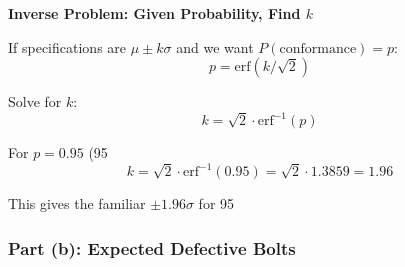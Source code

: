 \documentclass[12pt]{article}
\begin{document}
\begin{explanation}
\textbf{Inverse Problem: Given Probability, Find $k$}

If specifications are $\mu \pm k\sigma$ and we want $P(\text{conformance}) = p$:
\[
p = \text{erf}(k/\sqrt{2})
\]

Solve for $k$:
\[
k = \sqrt{2} \cdot \text{erf}^{-1}(p)
\]

For $p = 0.95$ (95%
\[
k = \sqrt{2} \cdot \text{erf}^{-1}(0.95) = \sqrt{2} \cdot 1.3859 = 1.96
\]

This gives the familiar $\pm 1.96\sigma$ for 95%

\end{explanation}

\subsubsection{Part (b): Expected Defective Bolts}
\end{document}
